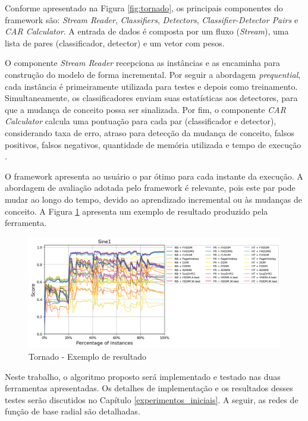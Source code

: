 \documentclass[qual, classic, a4paper]{ufbathesis}
\begin{document}
Conforme apresentado na Figura \ref{fig:tornado}, os principais componentes do framework são: 
\textit{Stream Reader}, \textit{Classifiers}, \textit{Detectors}, \textit{Classifier-Detector Pairs} e \textit{CAR Calculator}.
A entrada de dados é composta por um fluxo (\textit{Stream}), uma lista de pares (classificador, detector) e um vetor com pesos.

O componente \textit{Stream Reader} recepciona as instâncias e as encaminha para construção do modelo de forma incremental. 
Por seguir a abordagem \textit{prequential}, cada instância é primeiramente utilizada para testes e depois como treinamento.
Simultaneamente, os classificadores enviam suas estatísticas aos detectores, para que a mudança de conceito possa ser sinalizada.
Por fim, o componente \textit{CAR Calculator} calcula uma pontuação para cada par (classificador e detector), considerando taxa de erro, atraso para detecção da mudança de conceito, falsos positivos, falsos negativos, quantidade de memória utilizada e tempo de execução \cite{Pesaranghader:Tornado}.

O framework apresenta ao usuário o par ótimo para cada instante da execução. 
A abordagem de avaliação adotada pelo framework é relevante, pois este par pode mudar ao longo do tempo, devido ao aprendizado incremental ou às mudanças de conceito.
A Figura \ref{fig:tornado_out2} apresenta um exemplo de resultado produzido pela ferramenta.

\begin{figure}[H]
\begin{center}
    \includegraphics[scale=0.6]{imagens/tornado_out2.png}
    \caption{Tornado - Exemplo de resultado \cite{Pesaranghader:Tornado}}
    \label{fig:tornado_out2}
\end{center}
\end{figure}

Neste trabalho, o algoritmo proposto será implementado e testado nas duas ferramentas apresentadas.
Os detalhes de implementação e os resultados desses testes serão discutidos no Capítulo \ref{experimentos_iniciais}.
A seguir, as redes de função de base radial são detalhadas.
\end{document}
